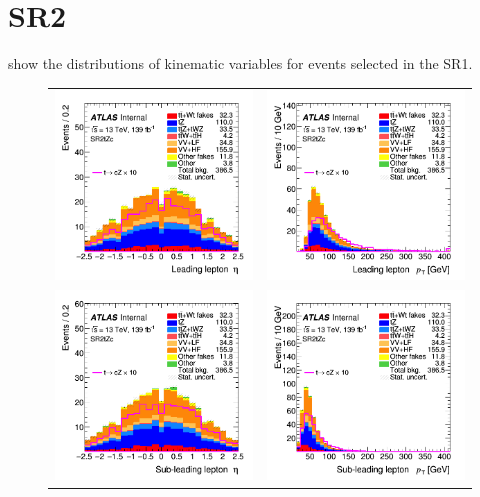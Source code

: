 \clearpage
\FloatBarrier
\newpage
\section{SR2\tZc}
\label{app:SRs:SR2}
 show the distributions 
of kinematic variables for events selected in the SR1\tZc.

\begin{figure}[!htbp]
	\centering
	\begin{tabular}{cc}
		\includegraphics[width=.35\textwidth]{Appendices/AP5/figures/SR2/lep1_eta} &
		\includegraphics[width=.35\textwidth]{Appendices/AP5/figures/SR2/lep1_pt} \\
		\includegraphics[width=.35\textwidth]{Appendices/AP5/figures/SR2/lep2_eta} &
		\includegraphics[width=.35\textwidth]{Appendices/AP5/figures/SR2/lep2_pt} \\

\end{tabular}
\end{figure}
